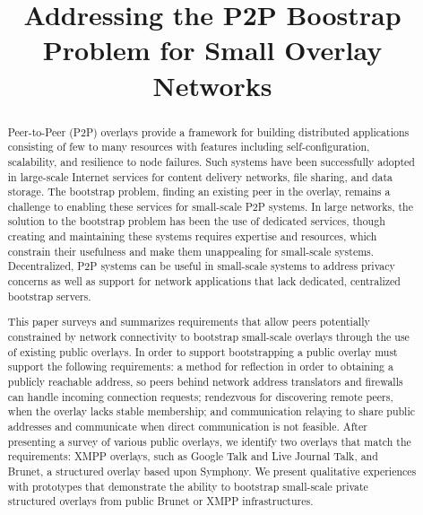 \documentclass[conference]{IEEEtran}
\begin{document}
\title{Addressing the P2P Boostrap Problem for Small Overlay Networks}

\author{
}

\maketitle

\begin{abstract}

Peer-to-Peer (P2P) overlays provide a framework for building distributed
applications consisting of few to many resources with features including
self-configuration, scalability, and resilience to node failures.  Such systems
have been successfully adopted in large-scale Internet services for content
delivery networks, file sharing, and data storage.  The bootstrap problem,
finding an existing peer in the overlay, remains a challenge to enabling these
services for small-scale P2P systems.  In large networks, the solution to the
bootstrap problem has been the use of dedicated services, though creating and
maintaining these systems requires expertise and resources, which constrain
their usefulness and make them unappealing for small-scale systems.
Decentralized, P2P systems can be useful in small-scale systems to address privacy
concerns as well as support for network applications that lack dedicated,
centralized bootstrap servers.

This paper surveys and summarizes requirements that allow peers potentially
constrained by network connectivity to bootstrap small-scale overlays through
the use of existing public overlays.  In order to support bootstrapping a
public overlay must support the following requirements: a method for reflection
in order to obtaining a publicly reachable address, so peers behind network
address translators and firewalls can handle incoming connection requests;
rendezvous for discovering remote peers, when the overlay lacks stable
membership; and communication relaying to share public addresses and
communicate when direct communication is not feasible.  After presenting a
survey of various public overlays, we identify two overlays that match the
requirements:  XMPP overlays, such as Google Talk and Live Journal Talk, and
Brunet, a structured overlay based upon Symphony.  We present qualitative
experiences with prototypes that demonstrate the ability to bootstrap
small-scale private structured overlays from public Brunet or XMPP
infrastructures.

\end{abstract}
\end{document}
